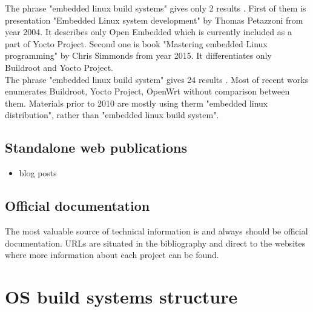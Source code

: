 \documentclass[printmode]{mgr}
\begin{document}
The phrase "embedded linux build systems" gives only 2 results  \cite{web:scholar-1}. First of them is presentation "Embedded Linux system development" by Thomas Petazzoni from year 2004. It describes only Open Embedded which is currently included as a part of Yocto Project. Second one is book "Mastering embedded Linux programming" by Chris Simmonds from year 2015. It differentiates only Buildroot and Yocto Project. \\

The phrase "embedded linux build system" gives 24 results \cite{web:scholar-2}. Most of recent works enumerates Buildroot, Yocto Project, OpenWrt without comparison between them. Materials prior to 2010 are mostly using therm "embedded linux distribution", rather than "embedded linux build system".

\subsection{Standalone web publications}

\begin{itemize}
    \item blog posts
\end{itemize}

\subsection{Official documentation}

The most valuable source of technical information is and always should be official documentation. URLs are situated in the bibliography and direct to the websites where more information about each project can be found.



\section{OS build systems structure}


\end{document}
